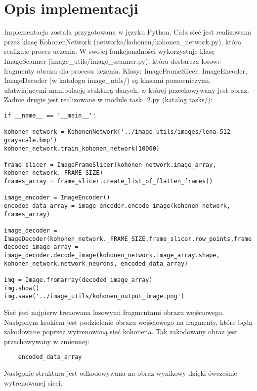 \documentclass{classrep}
\begin{document}
\section{Opis implementacji}
{Implementacja została przygotowana w języku Python. Cała sieć jest realizowana przez klasę KohonenNetwork (networks\slash kohonen\slash kohonen{\_}network.py), która realizuje proces uczenia. W swojej funkcjonalności wykorzystuje klasę ImageScanner (image{\_}utils\slash image{\_}scanner.py), która dostarcza losowe fragmenty obrazu dla procesu uczenia. Klasy: ImageFrameSlicer, ImageEncoder, ImageDecoder (w katalogu image{\_}utils\slash) są klasami pomocniczymi, ułatwiającymi manipulację stukturą danych, w której przechowywany jest obraz. Zadnie drugie jest realizowane w module task{\_}2.py (katalog tasks\slash): 
\begin{lstlisting}
if __name__ == '__main__':

kohonen_network = KohonenNetwork('../image_utils/images/lena-512-grayscale.bmp')
kohonen_network.train_kohonen_network(10000)

frame_slicer = ImageFrameSlicer(kohonen_network.image_array, kohonen_network._FRAME_SIZE)
frames_array = frame_slicer.create_list_of_flatten_frames()

image_encoder = ImageEncoder()
encoded_data_array = image_encoder.encode_image(kohonen_network, frames_array)

image_decoder = ImageDecoder(kohonen_network._FRAME_SIZE,frame_slicer.row_points,frame_slicer.column_points)
decoded_image_array = image_decoder.decode_image(kohonen_network.image_array.shape, kohonen_network.network_neurons, encoded_data_array)

img = Image.fromarray(decoded_image_array)
img.show()
img.save('../image_utils/kohonen_output_image.png')
\end{lstlisting}
Sieć jest najpierw trenowana losowymi fragmentami obrazu wejściowego. Następnym krokiem jest podzielenie obrazu wejściowego na fragmenty, które będą zakodowane poprzez wytrenowaną sieć kohonena. Tak zakodowany obraz jest przechowywany w zmiennej: 
\begin{lstlisting}
	encoded_data_array
\end{lstlisting}
Następnie struktura jest odkodowywana na obraz wynikowy dzięki ówcześnie wytrenowanej sieci.
}
\end{document}
